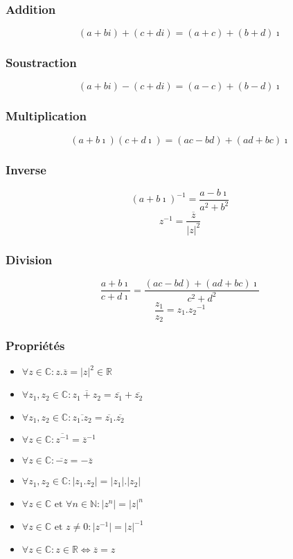 \documentclass[a4paper,10pt]{report}
\begin{document}
\subsubsection{Addition}
$$(a+bi)+(c+di)=(a+c)+(b+d)\imath$$
\subsubsection{Soustraction}
$$(a+bi)-(c+di)=(a-c)+(b-d)\imath$$
\subsubsection{Multiplication}
$$(a+b\imath)(c+d\imath)=(ac-bd)+(ad+bc)\imath$$
\subsubsection{Inverse}
$$(a+b\imath)^{-1}=\frac{a-b\imath}{a^2+b^2}$$
$$z^{-1}=\frac{\overline{z}}{{\vert z \vert}^2}$$
\subsubsection{Division}
$$\frac{a+b\imath}{c+d\imath}=\frac{(ac-bd)+(ad+bc)\imath}{c^2+d^2}$$
$$\frac{z_1}{z_2}=z_1 . {z_2}^{-1}$$

\subsubsection{Propriétés}

\begin{itemize}
\item{$\forall z \in \mathbb{C} : z.\overline{z}={\vert z \vert}^2 \in \mathbb{R}$}
\item{$\forall z_1, z_2 \in \mathbb{C} : \overline{z_1+z_2}=\overline{z_1}+\overline{z_2}$}
\item{$\forall z_1, z_2 \in \mathbb{C} : \overline{z_1.z_2}=\overline{z_1}.\overline{z_2}$}
\item{$\forall z \in \mathbb{C} : \overline{z^{-1}}=\overline{z}^{-1}$}
\item{$\forall z \in \mathbb{C} : \overline{-z}=-\overline{z}$}
\item{$\forall z_1, z_2 \in \mathbb{C} : \vert z_1.z_2 \vert =\vert z_1 \vert .\vert z_2 \vert$}
\item{$\forall z \in \mathbb{C} \mbox{ et } \forall n \in \mathbb{N} : \vert z^n \vert = {\vert z \vert}^n$}
\item{$\forall z \in \mathbb{C} \mbox{ et } z \neq 0 : \vert z^{-1} \vert = {\vert z \vert}^{-1}$}
\item{$\forall z \in \mathbb{C} : z \in \mathbb{R} \Leftrightarrow \overline{z}=z$}
\end{itemize}
\end{document}
